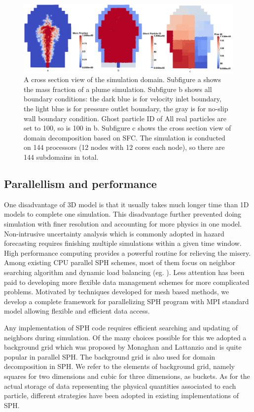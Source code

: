 \documentclass[journal abbreviation, manuscript]{copernicus}
\begin{document}
\begin{figure}
\includegraphics[width=18cm]{t120_bc_proc.png}
\caption{A cross section view of the simulation domain. Subfigure a shows the mass fraction of a plume simulation. Subfigure b shows all boundary conditions: the dark blue is for velocity inlet boundary, the light blue is for pressure outlet boundary, the gray is for no-slip wall boundary condition. Ghost particle ID of All real particles are set to 100, so is 100 in b. Subfigure c shows the cross section view of domain decomposition based on SFC. The simulation is conducted on 144 processors (12 nodes with 12 cores each node), so there are 144 subdomains in total.}
\label{fig:bc_and_domain_decomp}
\end{figure}

\subsection{Parallellism and performance}
One disadvantage of 3D model is that it usually takes much longer time than 1D models to complete one simulation. This disadvantage further prevented doing simulation with finer resolution and accounting for more physics in one model. Non-intrusive uncertainty analysis which is commonly adopted in hazard forecasting requires finishing multiple simulations within a given time window. High performance computing provides a powerful routine for relieving the misery. Among existing CPU parallel SPH schemes, most of them focus on neighbor searching algorithm and dynamic load balancing (eg. \citep {ferrari2009new, crespo2015dualsphysics}). Less attention has been paid to developing more flexible data management schemes for more complicated problems. Motivated by techniques developed for mesh based methods, we develop a complete framework for parallelizing SPH program with MPI standard model allowing flexible and efficient data access.

Any implementation of SPH code requires efficient searching and updating of neighbors during simulation. Of the many choices possible for this we adopted a background grid which was proposed by Monaghan and Lattanzio \citep {monaghan1985refined} and is quite popular in parallel SPH. The background grid is also used for domain decomposition in SPH. We refer to the elements of background grid, namely squares for two dimensions and cubic for three dimensions, as buckets. 
As for the actual storage of data representing the physical quantities associated to each particle, different strategies have been adopted in existing implementations of SPH.
\end{document}
